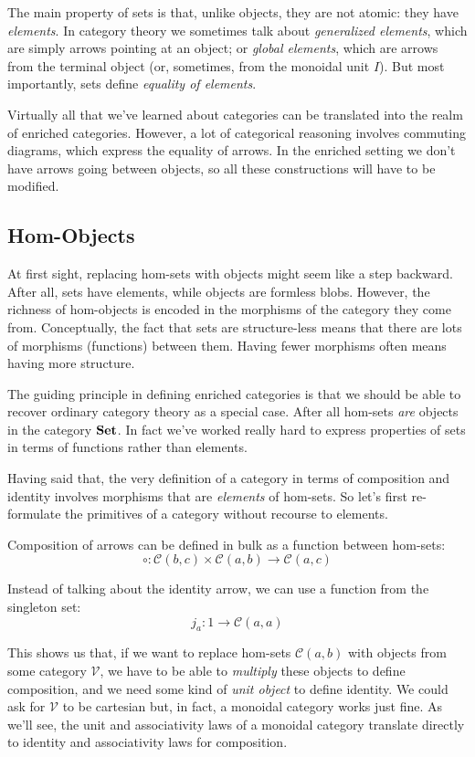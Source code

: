 \documentclass[DaoFP]{subfiles}
\begin{document}
The main property of sets is that, unlike objects, they are not atomic: they have \emph{elements}. In category theory we sometimes talk about \emph{generalized elements}, which are simply arrows pointing at an object; or \emph{global elements}, which are arrows from the terminal object (or, sometimes, from the monoidal unit $I$). But most importantly, sets define \emph{equality of elements}. 

Virtually all that we've learned about categories can be translated into the realm of enriched categories. However, a lot of categorical reasoning involves commuting diagrams, which express the equality of arrows. In the enriched setting we don't have arrows going between objects, so all these constructions will have to be modified.

\subsection{Hom-Objects}

At first sight, replacing hom-sets with objects might seem like a step backward. After all, sets have elements, while objects are formless blobs. However, the richness of hom-objects is encoded in the morphisms of the category they come from. Conceptually, the fact that sets are structure-less means that there are lots of morphisms (functions) between them. Having fewer morphisms often means having more structure. 

The guiding principle in defining enriched categories is that we should be able to recover ordinary category theory as a special case. After all hom-sets \emph{are} objects in the category $\mathbf{Set}$. In fact we've worked really hard to express properties of sets in terms of functions rather than elements. 

Having said that, the very definition of a category in terms of composition and identity involves morphisms that are \emph{elements} of hom-sets. So let's first re-formulate the primitives of a category without recourse to elements. 

Composition of arrows can be defined in bulk as a function between hom-sets:
\[ \circ \colon \mathcal C (b, c) \times \mathcal C (a, b) \to \mathcal C (a, c) \]

Instead of talking about the identity arrow, we can use a function from the singleton set:
\[ j_a \colon 1 \to \mathcal C (a, a) \]

This shows us that, if we want to replace hom-sets $\mathcal C (a, b)$ with objects from some category $\mathcal V$, we have to be able to \emph{multiply} these objects to define composition, and we need some kind of \emph{unit object} to define identity. We could ask for $\mathcal V$ to be cartesian but, in fact, a monoidal category works just fine. As we'll see, the unit and associativity laws of a monoidal category translate directly to identity and associativity laws for composition. 
\end{document}
